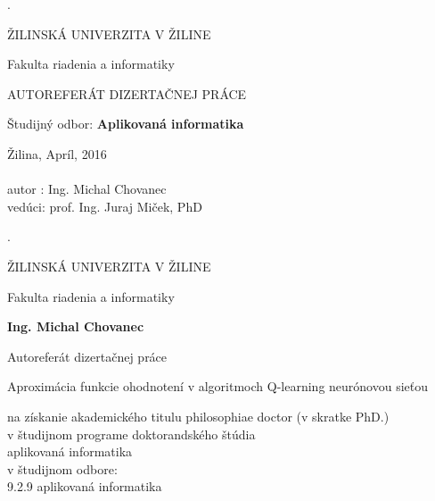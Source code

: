 
\begin{titlepage}
\phantom.

\bigskip

\begin{center}
{\sc\LARGE ŽILINSKÁ UNIVERZITA V ŽILINE}
\medskip

{\sc\Large Fakulta riadenia a informatiky}

\vfill\vfill\vfill\vfill

{\sc\LARGE AUTOREFERÁT DIZERTAČNEJ PRÁCE}

\medskip

{\large Študijný odbor: {\bf Aplikovaná informatika}}
\end{center}


\vfill\vfill\vfill\vfill

Žilina, Apríl, 2016 \\
\\
autor : Ing. Michal Chovanec \\
vedúci: prof. Ing. Juraj Miček, PhD

\medskip



\end{titlepage}








\begin{titlepage}
\phantom.

\bigskip

\begin{center}
{\sc\Large ŽILINSKÁ UNIVERZITA V ŽILINE}
\medskip

{\sc\Large Fakulta riadenia a informatiky}



\vfill\vfill\vfill\vfill
{\bf Ing. Michal Chovanec}
\vfill\vfill\vfill\vfill

Autoreferát dizertačnej práce

Aproximácia funkcie ohodnotení v algoritmoch Q-learning neurónovou sieťou



 \vfill\vfill\vfill\vfill



na získanie akademického titulu  philosophiae doctor (v skratke PhD.) \\
v študijnom programe doktorandského štúdia \\
aplikovaná informatika \\
v študijnom odbore: \\
9.2.9 aplikovaná informatika
\end{center}
\end{titlepage}





